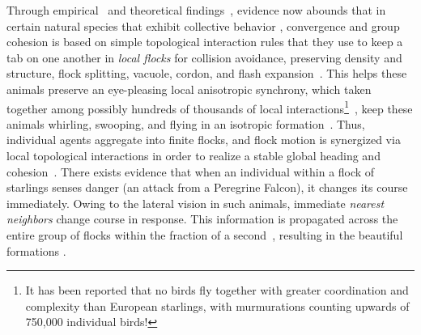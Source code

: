 %

Through empirical~\cite{Ballerini1232, Helbing20, VicsekPhaseNovel} %
and theoretical findings~\cite{JadbabaieCoord}, evidence now abounds that in certain natural species that exhibit collective behavior , convergence and group cohesion is based on simple topological interaction rules that they use to keep a tab on one another in \textit{local flocks} for collision avoidance, preserving density and structure, flock splitting, vacuole, cordon, and flash expansion~\cite{NatGeo}. This helps these animals preserve an eye-pleasing local anisotropic synchrony, which taken together among possibly hundreds of thousands of local interactions\footnote{It has been reported that no birds fly together with greater coordination and complexity than European starlings,  with murmurations counting upwards of 750,000 individual birds!}~\cite{NatGeo}, keep these animals whirling, swooping, and flying in an isotropic formation~\cite{Ballerini1232}. Thus, individual agents aggregate into finite flocks, and flock motion is synergized via local topological interactions in order to realize a stable global heading and cohesion~\cite{JadbabaieCoord}. There exists evidence that when an individual within a flock of starlings senses danger (\eg an attack from a Peregrine Falcon), it changes its course immediately. Owing to the lateral vision in such animals, immediate \textit{nearest neighbors} change course in response. This information is propagated across the entire group of flocks within the fraction of a second~\cite{Ballerini1232}, resulting in the beautiful formations . 


